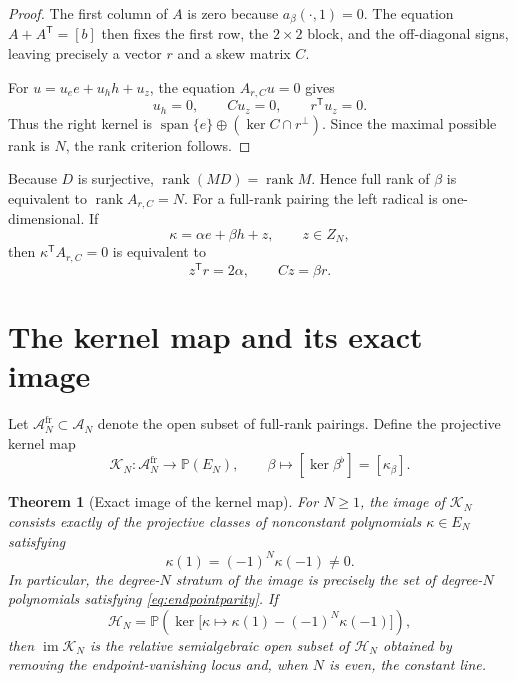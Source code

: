 \documentclass[11pt,a4paper]{article}
\newtheorem{theorem}{Theorem}[section]
\theoremstyle{definition}
\theoremstyle{remark}
\newcommand{\Pp}{\mathbb{P}}
\newcommand{\Ker}{\operatorname{ker}}
\newcommand{\rank}{\operatorname{rank}}
\newcommand{\im}{\operatorname{im}}
\newcommand{\spanof}{\operatorname{span}}
\newcommand{\cA}{\mathcal{A}}
\newcommand{\cK}{\mathcal{K}}
\begin{document}
\begin{proof}
The first column of $A$ is zero because $a_\beta(\cdot,1)=0$.  The equation
$A+A^{\mathsf T}=[b]$ then fixes the first row, the $2\times2$ block, and the off-diagonal
signs, leaving precisely a vector $r$ and a skew matrix $C$.

For $u=u_e e+u_hh+u_z$, the equation $A_{r,C}u=0$ gives
\[
 u_h=0,\qquad Cu_z=0,\qquad r^{\mathsf T}u_z=0.
\]
Thus the right kernel is
$\spanof\{e\}\oplus(\Ker C\cap r^\perp)$.  Since the maximal possible rank is $N$, the
rank criterion follows.
\end{proof}

Because $D$ is surjective, $\rank(MD)=\rank M$.  Hence full rank of $\beta$ is equivalent to
$\rank A_{r,C}=N$.  For a full-rank pairing the left radical is one-dimensional.  If
\begin{equation}\label{eq:kappadecomp}
 \kappa=\alpha e+\beta h+z,\qquad z\in Z_N,
\end{equation}
then $\kappa^{\mathsf T}A_{r,C}=0$ is equivalent to
\begin{equation}\label{eq:leftkerneleq}
 z^{\mathsf T}r=2\alpha,
 \qquad
 Cz=\beta r.
\end{equation}

\section{The kernel map and its exact image}

Let $\cA_N^{\mathrm{fr}}\subset\cA_N$ denote the open subset of full-rank pairings.  Define
the projective kernel map
\begin{equation}\label{eq:kernelmap}
 \cK_N:\cA_N^{\mathrm{fr}}\longrightarrow\Pp(E_N),
 \qquad
 \beta\longmapsto[\Ker\beta^\flat]=[\kappa_\beta].
\end{equation}

\begin{theorem}[Exact image of the kernel map]\label{thm:kernelimage}
For $N\geq1$, the image of $\cK_N$ consists exactly of the projective classes of nonconstant
polynomials $\kappa\in E_N$ satisfying
\begin{equation}\label{eq:endpointparity}
 \boxed{\kappa(1)=(-1)^N\kappa(-1)\neq0.}
\end{equation}
In particular, the degree-$N$ stratum of the image is precisely the set of degree-$N$
polynomials satisfying \eqref{eq:endpointparity}.
If
\begin{equation}\label{eq:projectivehyperplane}
 \mathcal H_N=
 \Pp\!\left(\Ker\bigl[\kappa\mapsto
 \kappa(1)-(-1)^N\kappa(-1)\bigr]\right),
\end{equation}
then $\im\cK_N$ is the relative semialgebraic open subset of $\mathcal H_N$ obtained by
removing the endpoint-vanishing locus and, when $N$ is even, the constant line.
\end{theorem}
\end{document}
